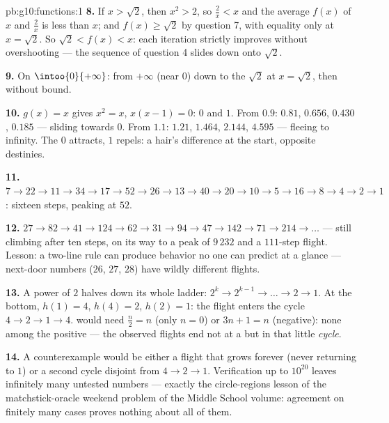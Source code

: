 \begin{solution}{pb:g10:functions:1}
\textbf{8.} If $x > \sqrt2$, then $x^2 > 2$, so
$\frac2x < x$ and the average $f(x)$ of $x$ and $\frac2x$ is
less than $x$; and $f(x) \geq \sqrt2$ by question 7, with
equality only at $x = \sqrt2$. So
$\sqrt2 < f(x) < x$: each iteration strictly improves without
overshooting --- the sequence of question 4 slides down onto
$\sqrt2$.

\textbf{9.} On $\intoo{0}{+\infty}$:  from
$+\infty$ (near $0$) down to the  $\sqrt2$ at
$x = \sqrt2$, then  without bound.

\textbf{10.} $g(x) = x$ gives $x^2 = x$, $x(x - 1) = 0$:  $0$ and $1$. From $0.9$: $0.81$, $0.656$, $0.430$,
$0.185$ --- sliding towards $0$. From $1.1$: $1.21$, $1.464$,
$2.144$, $4.595$ --- fleeing to infinity. The  $0$
attracts, $1$ repels: a hair's difference at the start, opposite
destinies.

\textbf{11.} $7 \to 22 \to 11 \to 34 \to 17 \to 52 \to 26 \to
13 \to 40 \to 20 \to 10 \to 5 \to 16 \to 8 \to 4 \to 2 \to 1$:
sixteen steps, peaking at $52$.

\textbf{12.} $27 \to 82 \to 41 \to 124 \to 62 \to 31 \to 94 \to
47 \to 142 \to 71 \to 214 \to \dots$ --- still climbing after
ten steps, on its way to a peak of $9\,232$ and a $111$-step
flight. Lesson: a two-line rule can produce behavior no one can
predict at a glance --- next-door numbers ($26$, $27$, $28$)
have wildly different flights.

\textbf{13.} A power of $2$ halves down its whole ladder:
$2^k \to 2^{k-1} \to \dots \to 2 \to 1$. At the bottom,
$h(1) = 4$, $h(4) = 2$, $h(2) = 1$: the flight enters the cycle
$4 \to 2 \to 1 \to 4$.  would need $\frac n2 = n$
(only $n = 0$) or $3n + 1 = n$ (negative): none among the
positive  --- the observed flights end not at a  but in that little \emph{cycle}.

\textbf{14.} A counterexample would be either a flight that
grows forever (never returning to $1$) or a second cycle
disjoint from $4 \to 2 \to 1$. Verification up to $10^{20}$
leaves infinitely many untested numbers --- exactly the
circle-regions lesson of the matchstick-oracle weekend problem of the Middle School volume: agreement on
finitely many cases proves nothing about all of them.


\end{solution}
